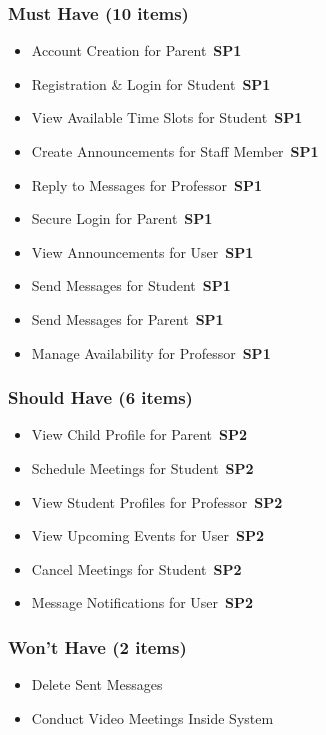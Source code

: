 \documentclass[12pt, a4paper]{article}
\newcommand{\sprintbadge}[1]{\colorbox{agileaccent}{\color{white}\tiny\bfseries\,SP#1\,}}
\begin{document}
\begin{tcolorbox}[enhanced,colback=agileorange!8,colframe=agileorange,boxrule=1pt,arc=5pt,title={\textbf{[4] Community Module MVP}},fonttitle=\bfseries\color{white},attach boxed title to top left={yshift=-3mm,xshift=6mm},boxed title style={colback=agileorange,arc=3pt}]
\subsubsection*{Must Have (10 items)}
\begin{itemize}[leftmargin=*,itemsep=3pt,label={$\bullet$}]
\item Account Creation for Parent \hfill\sprintbadge{1}
\item Registration \& Login for Student \hfill\sprintbadge{1}
\item View Available Time Slots for Student \hfill\sprintbadge{1}
\item Create Announcements for Staff Member \hfill\sprintbadge{1}
\item Reply to Messages for Professor \hfill\sprintbadge{1}
\item Secure Login for Parent \hfill\sprintbadge{1}
\item View Announcements for User \hfill\sprintbadge{1}
\item Send Messages for Student \hfill\sprintbadge{1}
\item Send Messages for Parent \hfill\sprintbadge{1}
\item Manage Availability for Professor \hfill\sprintbadge{1}
\end{itemize}

\subsubsection*{Should Have (6 items)}
\begin{itemize}[leftmargin=*,itemsep=3pt,label={$\bullet$}]
\item View Child Profile for Parent \hfill\sprintbadge{2}
\item Schedule Meetings for Student \hfill\sprintbadge{2}
\item View Student Profiles for Professor \hfill\sprintbadge{2}
\item View Upcoming Events for User \hfill\sprintbadge{2}
\item Cancel Meetings for Student \hfill\sprintbadge{2}
\item Message Notifications for User \hfill\sprintbadge{2}
\end{itemize}

\subsubsection*{Won't Have (2 items)}
\begin{itemize}[leftmargin=*,itemsep=3pt,label={$\bullet$}]
\item Delete Sent Messages
\item Conduct Video Meetings Inside System
\end{itemize}
\end{tcolorbox}
\end{document}
